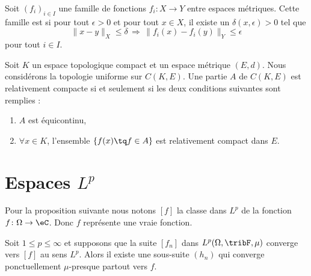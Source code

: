 \begin{definition}  \label{DefUWmVBcZ}
    Soit \( (f_i)_{i\in I}\) une famille de fonctions \( f_i\colon X\to Y\) entre espaces métriques. Cette famille est  si pour tout \( \epsilon>0\) et pour tout \( x\in X\), il existe un \( \delta(x,\epsilon)>0\) tel que 
    \begin{equation}
        \| x-y \|_X\leq \delta\,\Rightarrow\,\| f_i(x)-f_i(y) \|_Y\leq \epsilon
    \end{equation}
    pour tout \( i\in I\).
\end{definition}

\begin{theorem}        \label{ThoKRbtpah}
    Soit \( K\) un espace topologique compact et un espace métrique \( (E,d)\). Nous considérons la topologie uniforme sur \( C(K,E)\). Une partie \( A\) de \( C(K,E)\) est relativement compacte si et seulement si les deux conditions suivantes sont remplies :
    \begin{enumerate}
        \item
            \( A\) est équicontinu,
        \item
            \( \forall x\in K\), l'ensemble \( \{ f(x)\tq f\in A \}\) est relativement compact dans \( E\).
    \end{enumerate}
\end{theorem}

\section{Espaces \texorpdfstring{$L^p$}{Lp}}

Pour la proposition suivante nous notons \( [f]\) la classe dans \( L^p\) de la fonction \( f\colon \Omega\to \eC\). Donc \( f\) représente une vraie fonction.
\begin{proposition}  \label{PropWoywYG}
    Soit \( 1\leq p\leq \infty\) et supposons que la suite \( [f_n]\) dans \( L^p(\Omega,\tribF,\mu)\) converge vers \( [f]\) au sens \( L^p\). Alors il existe une sous-suite \( (h_n)\) qui converge ponctuellement \( \mu\)-presque partout vers \( f\).
\end{proposition}

